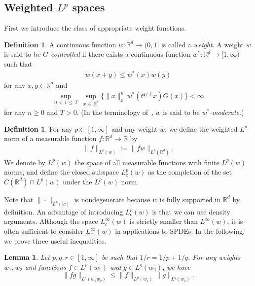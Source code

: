 \documentclass[10pt]{amsart}
\newtheorem{lemm}[theo]{Lemma}
\theoremstyle{definition}
\newtheorem{defi}[theo]{Definition}
\numberwithin{equation}{section}
\newcommand{\bbR}{\mathbb{R}}
\newcommand{\mfs}{\mathfrak{s}}
\newcommand{\wco}{w^*}
\begin{document}
\subsection{Weighted \texorpdfstring{$L^p$}{Lp} spaces}

First we introduce the class of appropriate weight functions.

\begin{defi}\label{defweight}
A continuous function $w:\bbR^d\to(0,1]$ is called a \emph{weight}. A weight $w$ is said to be \emph{$G$-controlled} if there exists a continuous function $\wco:\bbR^d\to[1,\infty)$ such that
\begin{align}\label{weightmoderate}
w(x+y)\le \wco(x)w(y)
\end{align}
for any $x,y\in\bbR^d$ and
\begin{align}\label{weightintegrable}
\sup_{0\,<\,t\,\le\,T}\;\sup_{x\,\in\,\bbR^d}\Big\{\|x\|_\mfs^n\,\wco\left(t^{\mfs/\ell}x\right)G(x)\Big\}<\infty
\end{align}
for any $n\ge0$ and $T>0$. (In the terminology of~\cite[Definition~2.3]{MW17}, $w$ is said to be \emph{$\wco$-moderate}.)
\end{defi}

\begin{defi}
For any $p\in[1,\infty]$ and any weight $w$, we define the weighted $L^p$ norm of a measurable function $f:\bbR^d\to\bbR$ by
\begin{align*}
\|f\|_{L^p(w)}:=\|fw\|_{L^p(\bbR^d)}.
\end{align*}
We denote by $L^p(w)$ the space of all measurable functions with finite $L^p(w)$ norms, and define the closed subspace $L_c^p(w)$ as the completion of the set $C(\bbR^d)\cap L^p(w)$ under the $L^p(w)$ norm.
\end{defi}

Note that $\|\cdot\|_{L^p(w)}$ is nondegenerate because $w$ is fully supported in $\bbR^d$ by definition. An advantage of introducing $L_c^p(w)$ is that we can use density arguments. Although the space $L_c^\infty(w)$ is strictly smaller than $L^\infty(w)$, it is often sufficient to consider $L_c^\infty(w)$ in applications to SPDEs. In the following, we prove three useful inequalities.

\begin{lemm}\label{lem:weightedholder}
Let $p,q,r\in[1,\infty]$ be such that $1/r=1/p+1/q$. For any weights $w_1,w_2$ and functions $f\in L^p(w_1)$ and $g\in L^q(w_2)$, we have
\[
\|fg\|_{L^r(w_1w_2)}\le\|f\|_{L^p(w_1)}\|g\|_{L^q(w_2)}.
\]
\end{lemm}
\end{document}
